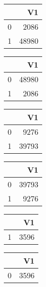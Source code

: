\bigskip\bigskip
\centering
\begin{tabular}{rr}
  \hline
 & V1 \\ 
  \hline
0 & 2086 \\ 
  1 & 48980 \\ 
   \hline
\end{tabular}

\bigskip\bigskip
\centering
\begin{tabular}{rr}
  \hline
 & V1 \\ 
  \hline
0 & 48980 \\ 
  1 & 2086 \\ 
   \hline
\end{tabular}

\bigskip\bigskip
\centering
\begin{tabular}{rr}
  \hline
 & V1 \\ 
  \hline
0 & 9276 \\ 
  1 & 39793 \\ 
   \hline
\end{tabular}

\bigskip\bigskip
\centering
\begin{tabular}{rr}
  \hline
 & V1 \\ 
  \hline
0 & 39793 \\ 
  1 & 9276 \\ 
   \hline
\end{tabular}

\bigskip\bigskip
\centering
\begin{tabular}{rr}
  \hline
 & V1 \\ 
  \hline
1 & 3596 \\ 
   \hline
\end{tabular}

\bigskip\bigskip
\centering
\begin{tabular}{rr}
  \hline
 & V1 \\ 
  \hline
0 & 3596 \\ 
   \hline
\end{tabular}

